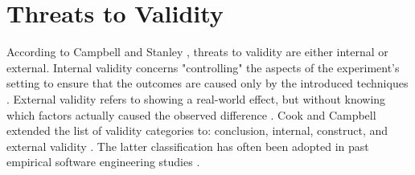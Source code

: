 \section{Threats to Validity}
According to Campbell and Stanley \cite{ResearchOfTeaching}, threats to validity are either internal or external. Internal validity concerns "controlling" the aspects of the experiment's setting to ensure that the outcomes are caused only by the introduced techniques \cite{DBLP:conf/icse/SiegmundSA15}. External validity refers to showing a real-world effect, but without knowing which factors actually caused the observed difference \cite{DBLP:conf/icse/SiegmundSA15}.
Cook and Campbell extended the list of validity categories to: conclusion, internal, construct, and external validity \cite{QuasiExp}. The latter classification has often been adopted in past empirical software engineering studies \cite{DBLP:books/sp/WohlinRHOR00}. 


